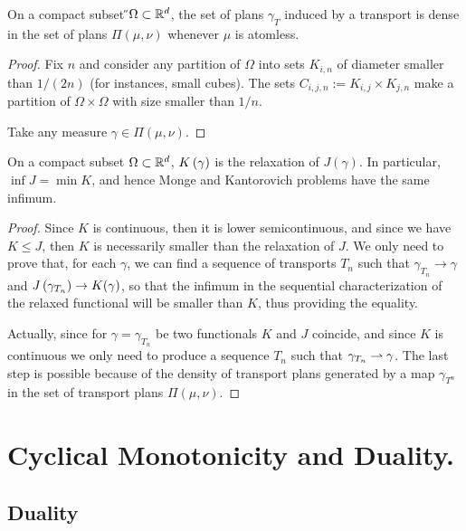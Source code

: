\begin{lemma}
On a compact subset  ̋$\Omega \subset \mathbb{R}^d$, the set of plans $\gamma_T$ induced by a transport is dense in the set of plans $\Pi(\mu, \nu) $ whenever $\mu$ is atomless.
\end{lemma}
\begin{proof}
	Fix $n$ and consider any partition of $\Omega$ into sets $K_{i,n}$ of diameter smaller than $1/(2n)$ (for instances, small cubes). The sets $C_{i,j,n}:=K_{i,j}\times K_{j,n}$ make a partition of $\Omega \times \Omega$ with size smaller than $1/n$.
	
	Take any measure $\gamma \in \Pi(\mu, \nu)$.
\end{proof}
\begin{theorem}
On a compact subset $\Omega \subset \mathbb{R}^d$,  $K\left(\gamma\right)$ is the relaxation of $J(\gamma)$. In particular, $\inf J = \min K$, and hence Monge and Kantorovich problems have the same infimum.
\end{theorem}
\begin{proof}
Since $K$ is continuous, then it is lower semicontinuous, and since we have $K\leq J$, then $K$ is necessarily smaller than the relaxation of $J$. We only need to prove that, for each $\gamma$, we can find a sequence of transports $T_n$ such that $\gamma_{T_n}\rightarrow \gamma$ and $J\left( \gamma_{T_n} \right)\rightarrow K(\gamma)$, so that the infimum in the sequential characterization of the relaxed functional will be smaller than $K$, thus providing the equality. 

Actually, since for $\gamma=\gamma_{T_n}$ be two functionals $K$ and $J$ coincide, and since $K$ is continuous we only need to produce a sequence $T_n$ such that $\gamma_{T_n}\rightharpoonup\gamma$. The last step is possible because of the density of transport plans generated by a map $\gamma_{T^n}$ in the set of transport plans $\Pi(\mu, \nu)$.
\end{proof}

\section{Cyclical Monotonicity and Duality.}

\subsection{Duality}

